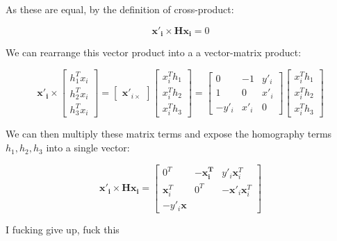 \documentclass{article}
\begin{document}
As these are equal, by the definition of cross-product:

\[
  \mathbf{x'_{i}} \times \mathbf{Hx_{i}}  = 0
\]

We can rearrange this vector product into a a vector-matrix product:

\[
  \mathbf{x'_{i}} \times \begin{bmatrix}
    h_{1}^{T} x_{i}\\ h_{2}^{T}x_{i} \\ h_{3}^{T}x_{i}
  \end{bmatrix}  =
  \begin{bmatrix}
    \mathbf{x'}_{i\times}
  \end{bmatrix}\begin{bmatrix}
    x_{i}^{T}h_{1}\\ x_{i}^{T}h_{2} \\ x_{i}^{T}h_{3}
  \end{bmatrix} =
  \begin{bmatrix}
    0 & -1 & y'_{i} \\
    1 & 0 & x'_{i} \\
    -y'_{i} & x'_{i} & 0
  \end{bmatrix}\begin{bmatrix}
    x_{i}^{T}h_{1}\\ x_{i}^{T}h_{2} \\ x_{i}^{T}h_{3}
  \end{bmatrix}
\]

We can then multiply these matrix terms and expose the homography terms $h_{1}, h_{2}, h_{3}$ into a single vector:

\[
  \mathbf{x'_{i}}\times \mathbf{Hx_{i}} = \begin{bmatrix}
    0^{T} & - \mathbf{x_{i}^{T}} & y'_{i}\mathbf{x}_{i}^{T} \\
    \mathbf{x}_{i}^{T} & 0^{T} & -\mathbf{x'}_{i}\mathbf{x}_{i}^{T} \\
    -y'_{i} \mathbf{x}
  \end{bmatrix}
\]

I fucking give up, fuck this
\end{document}
